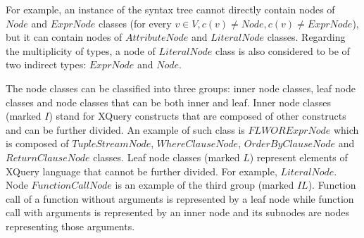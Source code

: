 For example, an instance of the syntax tree cannot directly contain nodes of $Node$ and $ExprNode$ classes (for every $v \in V, c(v) \neq Node, c(v) \neq ExprNode$), but it can contain nodes of $AttributeNode$ and $LiteralNode$ classes. Regarding the multiplicity of types, a node of $LiteralNode$ class is also considered to be of two indirect types: $ExprNode$ and $Node$.


The node classes can be classified into three groups: inner node classes, leaf node classes and node classes that can be both inner and leaf. Inner node classes (marked $I$) stand for XQuery constructs that are composed of other constructs and can be further divided. An example of such class is $FLWORExprNode$ which is composed of $TupleStreamNode$, $WhereClauseNode$, $OrderByClauseNode$ and $ReturnClauseNode$ classes. Leaf node classes (marked $L$) represent elements of XQuery language that cannot be further divided. For example, $LiteralNode$. Node $FunctionCallNode$ is an example of the third group (marked $IL$). Function call of a function without arguments is represented by a leaf node while function call with arguments is represented by an inner node and its subnodes are nodes representing those arguments.

